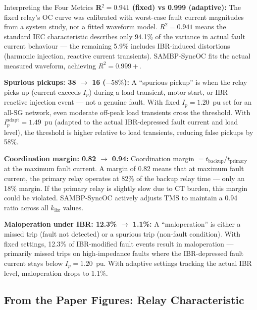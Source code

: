 \documentclass[12pt,a4paper]{article}
\newcommand{\kibr}{k_\mathrm{ibr}}
\newcommand{\TMS}{\mathrm{TMS}}
\newcommand{\Ip}{I_p}
\begin{document}
\begin{resultbox}{Interpreting the Four Metrics}
\textbf{R$^2 = 0.941$ (fixed) vs 0.999 (adaptive):}
The fixed relay's OC curve was calibrated with worst-case fault current magnitudes from a system study, not a fitted waveform model. $R^2 = 0.941$ means the standard IEC characteristic describes only 94.1\% of the variance in actual fault current behaviour --- the remaining 5.9\% includes IBR-induced distortions (harmonic injection, reactive current transients). SAMBP-SyncOC fits the actual measured waveform, achieving $R^2 = 0.999+$.

\textbf{Spurious pickups: 38 $\to$ 16 ($-58\%$):}
A ``spurious pickup'' is when the relay picks up (current exceeds $I_p$) during a load transient, motor start, or IBR reactive injection event --- not a genuine fault. With fixed $I_p = 1.20$~pu set for an all-SG network, even moderate off-peak load transients cross the threshold. With $\Ip^\mathrm{adapt} = 1.49$~pu (adapted to the actual IBR-depressed fault current and load level), the threshold is higher relative to load transients, reducing false pickups by 58\%.

\textbf{Coordination margin: 0.82 $\to$ 0.94:}
Coordination margin $= t_\mathrm{backup}/t_\mathrm{primary}$ at the maximum fault current. A margin of 0.82 means that at maximum fault current, the primary relay operates at 82\% of the backup relay time --- only an 18\% margin. If the primary relay is slightly slow due to CT burden, this margin could be violated. SAMBP-SyncOC actively adjusts $\TMS$ to maintain a 0.94 ratio across all $\kibr$ values.

\textbf{Maloperation under IBR: 12.3\% $\to$ 1.1\%:}
A ``maloperation'' is either a missed trip (fault not detected) or a spurious trip (non-fault condition). With fixed settings, 12.3\% of IBR-modified fault events result in maloperation --- primarily missed trips on high-impedance faults where the IBR-depressed fault current stays below $I_p = 1.20$~pu. With adaptive settings tracking the actual IBR level, maloperation drops to 1.1\%.
\end{resultbox}

\subsection{From the Paper Figures: Relay Characteristic}
\end{document}
